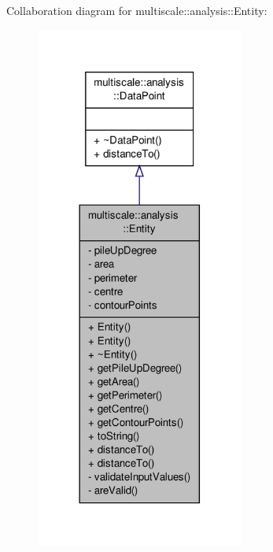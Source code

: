 Collaboration diagram for multiscale\-:\-:analysis\-:\-:Entity\-:\nopagebreak
\begin{figure}[H]
\begin{center}
\leavevmode
\includegraphics[width=194pt]{classmultiscale_1_1analysis_1_1Entity__coll__graph}
\end{center}
\end{figure}
